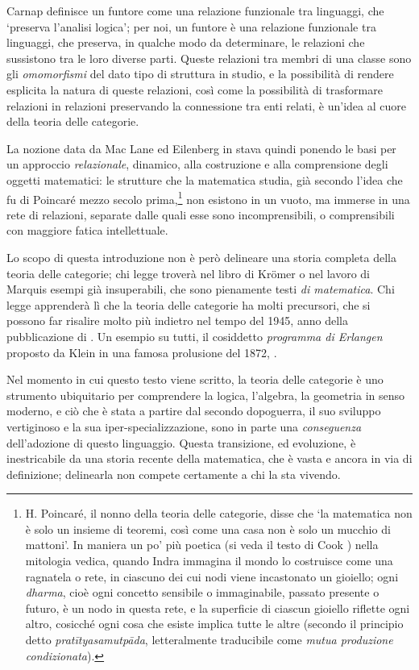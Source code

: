 Carnap definisce un funtore come una relazione funzionale tra linguaggi, che `preserva l'analisi logica'; per noi, un funtore è una relazione funzionale tra linguaggi, che preserva, in qualche modo da determinare, le relazioni che sussistono tra le loro diverse parti. Queste relazioni tra membri di una classe sono gli \emph{omomorfismi} del dato tipo di struttura in studio, e la possibilità di rendere esplicita la natura di queste relazioni, così come la possibilità di trasformare relazioni in relazioni preservando la connessione tra enti relati, è un'idea al cuore della teoria delle categorie.

La nozione data da Mac Lane ed Eilenberg in \cite{gtone} stava quindi ponendo le basi per un approccio \emph{relazionale}, dinamico, alla costruzione e alla comprensione degli oggetti matematici: le strutture che la matematica studia, già secondo l'idea che fu di Poincaré mezzo secolo prima,\footnote{H. Poincaré, il nonno della teoria delle categorie, disse che `la matematica non è solo un insieme di teoremi, così come una casa non è solo un mucchio di mattoni'. In maniera un po' più poetica (si veda il testo di Cook \cite{Cook1977-ry}) nella mitologia vedica, quando Indra immagina il mondo lo costruisce come una ragnatela o rete, in ciascuno dei cui nodi viene incastonato un gioiello; ogni \emph{dharma}, cioè ogni concetto sensibile o immaginabile, passato presente o futuro, è un nodo in questa rete, e la superficie di ciascun gioiello riflette ogni altro, cosicché ogni cosa che esiste implica tutte le altre (secondo il principio detto \emph{pratītyasamutpāda}, letteralmente traducibile come \emph{mutua produzione condizionata}).} non esistono in un vuoto, ma immerse in una rete di relazioni, separate dalle quali esse sono incomprensibili, o comprensibili con maggiore fatica intellettuale.

\medskip
Lo scopo di questa introduzione non è però delineare una storia completa della teoria delle categorie; chi legge troverà nel libro di Kr\"omer \cite{kromer} o nel lavoro di Marquis \cite{marquis} esempi già insuperabili, che sono pienamente testi \emph{di matematica}. Chi legge apprenderà lì che la teoria delle categorie ha molti precursori, che si possono far risalire molto più indietro nel tempo del 1945, anno della pubblicazione di \cite{gtone}. Un esempio su tutti, il cosiddetto \emph{programma di Erlangen} proposto da Klein in una famosa prolusione del 1872, \cite{Klein1893}.

Nel momento in cui questo testo viene scritto, la teoria delle categorie è uno strumento ubiquitario per comprendere la logica, l'algebra, la geometria in senso moderno, e ciò che è stata a partire dal secondo dopoguerra, il suo sviluppo vertiginoso e la sua iper-specializzazione, sono in parte una \emph{conseguenza} dell'adozione di questo linguaggio. Questa transizione, ed evoluzione, è inestricabile da una storia recente della matematica, che è vasta e ancora in via di definizione; delinearla non compete certamente a chi la sta vivendo.

